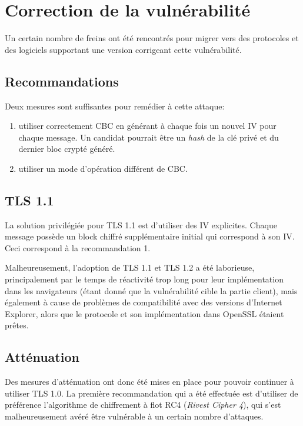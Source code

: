 \documentclass[a4paper,twoside]{article}
\begin{document}
\section{Correction de la vulnérabilité}

Un certain nombre de freins ont été rencontrés pour migrer vers des protocoles et
des logiciels supportant une version corrigeant cette vulnérabilité.

\subsection{Recommandations}

Deux mesures sont suffisantes pour remédier à cette attaque:

\begin{enumerate}
    \item utiliser correctement CBC en générant à chaque fois un nouvel IV
	pour chaque message. Un candidat pourrait être un \emph{hash} de la
	clé privé et du dernier bloc crypté généré.
    \item utiliser un mode d'opération différent de CBC.
\end{enumerate}

\subsection{TLS 1.1}

La solution privilégiée pour TLS 1.1 est d'utiliser des IV explicites.
Chaque message possède un block chiffré supplémentaire initial qui
correspond à son IV. Ceci correspond à la recommandation 1.

Malheureusement, l'adoption de TLS 1.1 et TLS 1.2 a été laborieuse,
principalement par le temps de réactivité trop long pour leur
implémentation dans les navigateurs (étant donné que la vulnérabilité cible
la partie client), mais également à cause de problèmes de compatibilité
avec des versions d'Internet Explorer, alors que le protocole et son
implémentation dans OpenSSL étaient prêtes.

\subsection{Atténuation}

Des mesures d'atténuation ont donc été mises en place pour pouvoir continuer
à utiliser TLS 1.0. La première recommandation qui a été effectuée est
d'utiliser de préférence l'algorithme de chiffrement à flot RC4
(\emph{Rivest Cipher 4}), qui s'est malheureusement avéré être vulnérable à
un certain nombre d'attaques.
\end{document}
